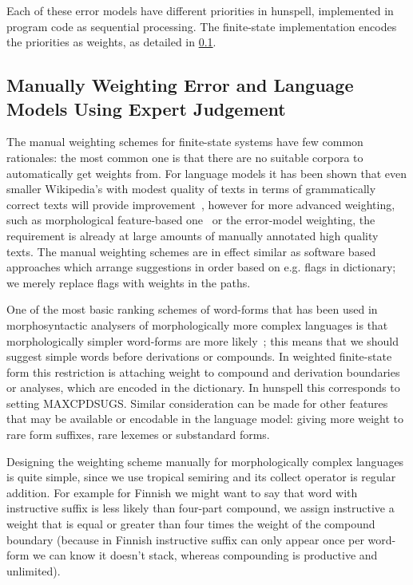 \documentclass[a4paper,12pt]{article}
\begin{document}
Each of these error models have different priorities in hunspell, implemented
in program code as sequential processing. The finite-state implementation
encodes the priorities as weights, as detailed in
\ref{subsec:manual-weighting}.

\subsection{Manually Weighting Error and Language Models Using Expert Judgement}
\label{subsec:manual-weighting}

The manual weighting schemes for finite-state systems have few common
rationales: the most common one is that there are no suitable corpora to
automatically get weights from. For language models it has been shown that even
smaller Wikipedia's with modest quality of texts in terms of grammatically
correct texts will provide improvement~\cite{pirinen/2010/lrec}, however for
more advanced weighting, such as morphological feature-based
one~\cite{pirinen2012improving} or the error-model weighting, the requirement
is already at large amounts of manually annotated high quality texts. The
manual weighting schemes are in effect similar as software based approaches
which arrange suggestions in order based on e.g. flags in dictionary; we
merely replace flags with weights in the paths.

One of the most basic ranking schemes of word-forms that has been used in
morphosyntactic analysers of morphologically more complex languages is that
morphologically simpler word-forms are more
likely~\cite{karlsson1992swetwol}; this means that we should suggest simple
words before derivations or compounds. In weighted finite-state form this
restriction is attaching weight to compound and derivation boundaries or
analyses, which are encoded in the dictionary. In hunspell this corresponds to
setting MAXCPDSUGS. Similar consideration can be made for other features that
may be available or encodable in the language model: giving more weight to
rare form suffixes, rare lexemes or substandard forms.

Designing the weighting scheme manually for morphologically complex languages
is quite simple, since we use tropical semiring and its collect operator is
regular addition. For example for Finnish we might want to say that word with
instructive suffix is less likely than four-part compound, we assign instructive
a weight that is equal or greater than four times the weight of the compound
boundary (because in Finnish instructive suffix can only appear once per
word-form we can know it doesn't stack, whereas compounding is productive
and unlimited).
\end{document}

